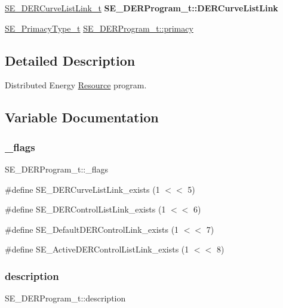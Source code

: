 \begin{DoxyCompactItemize}
\item 
\mbox{\label{group__DERProgram_gad8a76492c7f7fb6ec95122a59f86b3ff}} 
\hyperlink{structSE__DERCurveListLink__t}{S\+E\+\_\+\+D\+E\+R\+Curve\+List\+Link\+\_\+t} {\bfseries S\+E\+\_\+\+D\+E\+R\+Program\+\_\+t\+::\+D\+E\+R\+Curve\+List\+Link}
\item 
\hyperlink{group__PrimacyType_ga484b22ef8ff92c8801e6a8b7bd8351eb}{S\+E\+\_\+\+Primacy\+Type\+\_\+t} \hyperlink{group__DERProgram_gaefdd7cf83f9d937976f8eacc6433d963}{S\+E\+\_\+\+D\+E\+R\+Program\+\_\+t\+::primacy}
\end{DoxyCompactItemize}


\subsection{Detailed Description}
Distributed Energy \hyperlink{structResource}{Resource} program. 

\subsection{Variable Documentation}
\mbox{\label{group__DERProgram_ga9659c1a566294e642a8937f01a8f29a6}} 
\subsubsection{\texorpdfstring{\+\_\+flags}{\_flags}}
{\footnotesize\ttfamily S\+E\+\_\+\+D\+E\+R\+Program\+\_\+t\+::\+\_\+flags}

\#define S\+E\+\_\+\+D\+E\+R\+Curve\+List\+Link\+\_\+exists (1 $<$$<$ 5)

\#define S\+E\+\_\+\+D\+E\+R\+Control\+List\+Link\+\_\+exists (1 $<$$<$ 6)

\#define S\+E\+\_\+\+Default\+D\+E\+R\+Control\+Link\+\_\+exists (1 $<$$<$ 7)

\#define S\+E\+\_\+\+Active\+D\+E\+R\+Control\+List\+Link\+\_\+exists (1 $<$$<$ 8) \mbox{\label{group__DERProgram_ga9b079eeab8cef3afd53f741d84d2901d}} 
\subsubsection{\texorpdfstring{description}{description}}
{\footnotesize\ttfamily S\+E\+\_\+\+D\+E\+R\+Program\+\_\+t\+::description}

